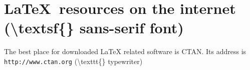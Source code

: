 \documentclass[letterpaper, 12pt]{article}
\begin{document}
\newcommand{\textttEx}{\textbackslash{}texttt\{\} }
\newcommand{\textsfEx}{\textbackslash{}textsf\{\} }


\section{\textsf{\LaTeX\ resources on the internet} (\textsfEx sans-serif font)} 
The best place for downloaded LaTeX related software is CTAN.
Its address is \texttt{http://www.ctan.org} (\textttEx typewriter)

\end{document}
